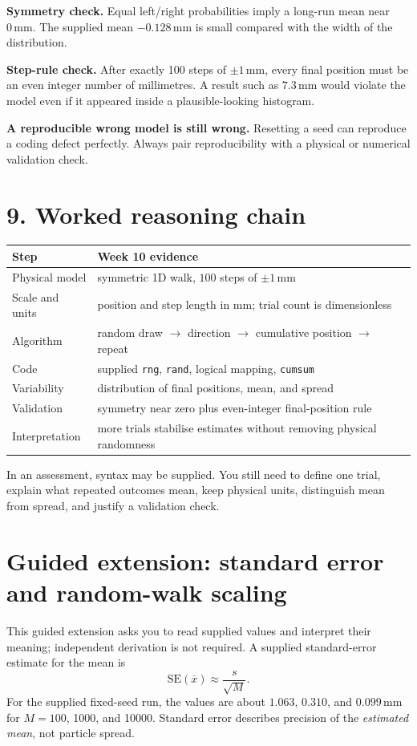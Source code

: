 \documentclass[11pt,a4paper]{article}
\newcommand{\units}[1]{\,\mathrm{#1}}
\begin{document}
\textbf{Symmetry check.} Equal left/right probabilities imply a long-run mean near $0\units{mm}$. The supplied mean $-0.128\units{mm}$ is small compared with the width of the distribution.

\textbf{Step-rule check.} After exactly 100 steps of $\pm1\units{mm}$, every final position must be an even integer number of millimetres. A result such as $7.3\units{mm}$ would violate the model even if it appeared inside a plausible-looking histogram.

\begin{aibox}\textbf{A reproducible wrong model is still wrong.} Resetting a seed can reproduce a coding defect perfectly. Always pair reproducibility with a physical or numerical validation check.\end{aibox}

\section*{9. Worked reasoning chain}
\begin{center}\small
\begin{tabular}{p{.25\linewidth}p{.67\linewidth}}
\toprule
Step & Week 10 evidence\\
\midrule
Physical model & symmetric 1D walk, $100$ steps of $\pm1\units{mm}$\\
Scale and units & position and step length in mm; trial count is dimensionless\\
Algorithm & random draw $\rightarrow$ direction $\rightarrow$ cumulative position $\rightarrow$ repeat\\
Code & supplied \texttt{rng}, \texttt{rand}, logical mapping, \texttt{cumsum}\\
Variability & distribution of final positions, mean, and spread\\
Validation & symmetry near zero plus even-integer final-position rule\\
Interpretation & more trials stabilise estimates without removing physical randomness\\
\bottomrule
\end{tabular}
\end{center}

In an assessment, syntax may be supplied. You still need to define one trial, explain what repeated outcomes mean, keep physical units, distinguish mean from spread, and justify a validation check.

\section*{Guided extension: standard error and random-walk scaling}
This guided extension asks you to read supplied values and interpret their meaning; independent derivation is not required. A supplied standard-error estimate for the mean is
\[
\mathrm{SE}(\overline{x})\approx\frac{s}{\sqrt{M}}.
\]
For the supplied fixed-seed run, the values are about $1.063$, $0.310$, and $0.099\units{mm}$ for $M=100$, 1000, and 10000. Standard error describes precision of the \emph{estimated mean}, not particle spread.
\end{document}
